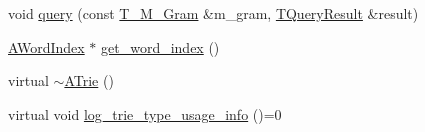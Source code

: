\begin{DoxyCompactItemize}
\item 
void \hyperlink{classuva_1_1smt_1_1tries_1_1_a_trie_a931c433a086f8f03dd6260e0d27dfd79}{query} (const \hyperlink{structuva_1_1smt_1_1tries_1_1mgrams_1_1_t___m___gram}{T\+\_\+\+M\+\_\+\+Gram} \&m\+\_\+gram, \hyperlink{structuva_1_1smt_1_1tries_1_1_t_query_result}{T\+Query\+Result} \&result)
\item 
\hyperlink{classuva_1_1smt_1_1tries_1_1dictionary_1_1_a_word_index}{A\+Word\+Index} $\ast$ \hyperlink{classuva_1_1smt_1_1tries_1_1_a_trie_a6d435385f750ffc9c129d1e800491ff8}{get\+\_\+word\+\_\+index} ()
\item 
virtual \hyperlink{classuva_1_1smt_1_1tries_1_1_a_trie_a5e72747b386ce5a2c9a41064c77e16e6}{$\sim$\+A\+Trie} ()
\item 
virtual void \hyperlink{classuva_1_1smt_1_1tries_1_1_a_trie_a4266759644e0ebfda77ab1a851a660af}{log\+\_\+trie\+\_\+type\+\_\+usage\+\_\+info} ()=0
\end{DoxyCompactItemize}
